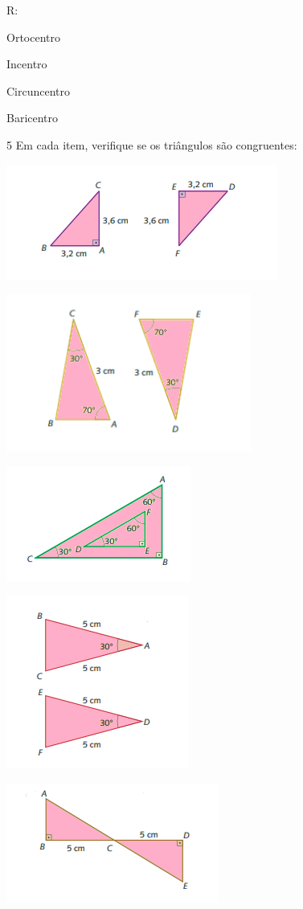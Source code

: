 {R:
\item Ortocentro
\item Incentro
\item Circuncentro
\item Baricentro

\num{5} Em cada item, verifique se os triângulos são congruentes:
\item
\includegraphics[width=3.51042in,height=1.48958in]{./imgSAEB_8_MAT/media/image19.png}
\item
\includegraphics[width=3.16667in,height=2.03958in]{./imgSAEB_8_MAT/media/image20.png}
\item
\includegraphics[width=2.38542in,height=1.47917in]{./imgSAEB_8_MAT/media/image21.png}
\item
\includegraphics[width=2.35417in,height=2.23958in]{./imgSAEB_8_MAT/media/image22.png}
\item
\includegraphics[width=2.73958in,height=1.54167in]{./imgSAEB_8_MAT/media/image23.png}

}
